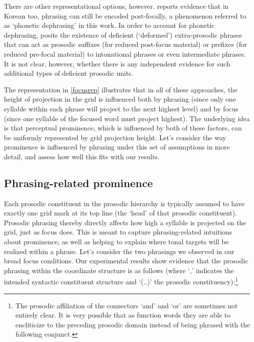 \documentclass[preprint,review,12pt,authoryear,times]{elsarticle}
\begin{document}
There are other representational options, however. \citet{jun11} reports evidence that in Korean too, phrasing can still be encoded post-focally, a phenomenon referred to as `phonetic dephrasing' in this work. In order to account for phonetic dephrasing, \citet{jun11} posits the existence of deficient (`deformed') extra-prosodic phrases that can act as prosodic suffixes (for reduced post-focus material) or prefixes (for reduced pre-focal material) to intonational phrases or even intermediate phrases. It is not clear, however, whether there is any independent evidence for such additional types of deficient prosodic units. 

The representation in \ref{focusrep} illustrates that in all of these approaches, the height of projection in the grid  is influenced both by phrasing (since only one syllable within each phrase will project to the next highest level) and by focus  (since one syllable of the focused word must project highest). The underlying idea is that perceptual prominence, which is influenced by both of these factors, can be uniformly represented by grid projection height. Let's consider the way prominence is influenced by phrasing under this set of assumptions in more detail, and assess how well this fits with our results.   


\subsection{Phrasing-related prominence}

Each prosodic constituent in the prosodic hierarchy is typically assumed  to have exactly one grid mark at its top line (the `head' of that prosodic constituent). Prosodic phrasing thereby directly affects how high a syllable is projected on the grid,  just as focus does. This is meant to capture phrasing-related intuitions about prominence, as well as helping to explain where tonal targets will be realized within a phrase.  Let's consider the two phrasings we observed in our broad focus conditions. Our experimental results show evidence that the prosodic phrasing within the coordinate structure is as follows (where `,' indicates the intended syntactic constituent structure and `(..)' the prosodic constituency):\footnote{The prosodic affiliation of the connectors `and' and `or' are sometimes not entirely clear. It is very possible that as function words they are able to encliticize to the preceding prosodic domain instead of being phrased with the following conjunct.}
\end{document}
